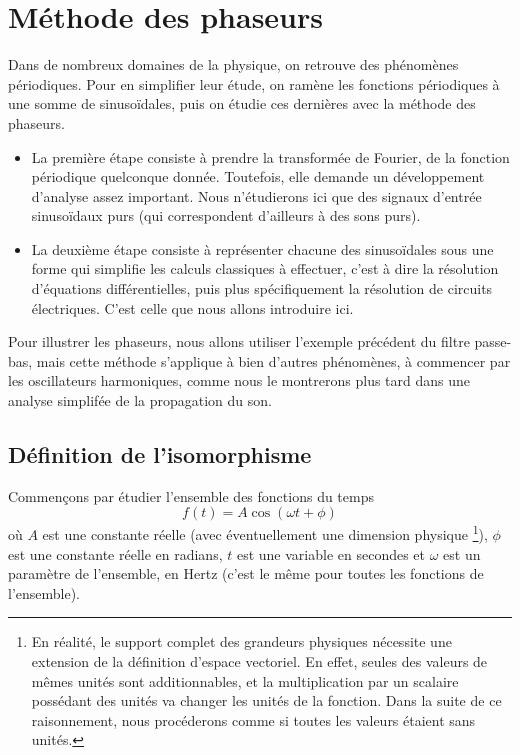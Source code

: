 \section{Méthode des phaseurs}

Dans de nombreux domaines de la physique,
on retrouve des phénomènes périodiques.
Pour en simplifier leur étude,
on ramène les fonctions périodiques à une somme de sinusoïdales,
puis on étudie ces dernières avec la méthode des phaseurs.
\begin{itemize}
    \item La première étape consiste à prendre la transformée de Fourier,
        de la fonction périodique quelconque donnée.
        Toutefois, elle demande un développement d'analyse assez important.
        Nous n'étudierons ici que des signaux d'entrée sinusoïdaux purs
        (qui correspondent d'ailleurs à des sons purs).
    \item La deuxième étape consiste à représenter chacune des sinusoïdales
        sous une forme qui simplifie les calculs classiques à effectuer,
        c'est à dire la résolution d'équations différentielles,
        puis plus spécifiquement la résolution de circuits électriques.
        C'est celle que nous allons introduire ici.
\end{itemize}

Pour illustrer les phaseurs, nous allons utiliser l'exemple précédent
du filtre passe-bas,
mais cette méthode s'applique à bien d'autres phénomènes,
à commencer par les oscillateurs harmoniques,
comme nous le montrerons plus tard dans
une analyse simplifée de la propagation du son.

\subsection{Définition de l'isomorphisme}
Commençons par étudier l'ensemble des fonctions du temps
\[
    f(t) = A\cos(\omega t + \phi)
\]
où $A$ est une constante réelle (avec éventuellement une dimension physique
\footnote{
    En réalité, le support complet des grandeurs physiques
    nécessite une extension de la définition d'espace vectoriel.
    En effet, seules des valeurs de mêmes unités sont additionnables,
    et la multiplication par un scalaire possédant des unités
    va changer les unités de la fonction.
    Dans la suite de ce raisonnement,
    nous procéderons comme si toutes les valeurs étaient sans unités.
}),
$\phi$ est une constante réelle en radians,
$t$ est une variable en secondes
et $\omega$ est un paramètre de l'ensemble, en Hertz
(c'est le même pour toutes les fonctions de l'ensemble).

